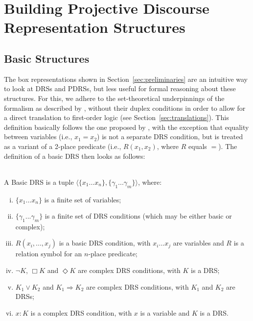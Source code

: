 \section{Building Projective Discourse Representation Structures}
\label{sec:building}


\subsection{Basic Structures}

The box representations shown in Section~\ref{sec:preliminaries} are an
intuitive way to look at DRSs and PDRSs, but less useful for formal
reasoning about these structures. For this, we adhere to the set-theoretical
underpinnings of the formalism as described by
, without their duplex conditions in order to
allow for a direct translation to first-order logic (see
Section~\ref{sec:translations}). This definition basically follows the one
proposed by , with the exception that
equality between variables (i.e., $x_1=x_2$) is not a separate DRS
condition, but is treated as a variant of a 2-place predicate (i.e.,
$R(x_1,x_2)$, where $R$ equals $=$). The definition of a basic DRS then
looks as follows:

\begin{definition} \label{def:bDRS}~\\
A Basic DRS is a tuple $\langle \{x_1 ... x_n\},\{\gamma_1 ... \gamma_m\} 
\rangle$, where:
 \begin{enumerate}[i.]
  \item $\{x_1 ... x_n\}$ is a finite set of variables;
  \item $\{\gamma_1 ... \gamma_m\}$ is a finite set of DRS conditions (which
    may be either basic or complex);
  \item\label{def:bDRS:Rel} $R(x_i, ..., x_j)$ is a basic DRS condition,
    with $x_i ... x_j$ are variables and $R$ is a relation symbol for an
    $n$-place predicate;
  \item $\neg K$, $\Box K$ and $\Diamond K$ are complex DRS conditions, with
    $K$ is a DRS;
  \item $K_1 \vee K_2$ and $K_1 \Rightarrow K_2$ are complex DRS conditions,
    with $K_1$ and $K_2$ are DRSs;
  \item \label{def:bDRS:Prop} $x:K$ is a complex DRS condition, with $x$ is
    a variable and $K$ is a DRS.
 \end{enumerate} 
\end{definition}

